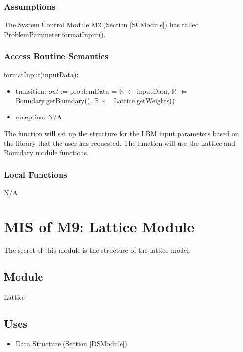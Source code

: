 \documentclass[12pt, titlepage]{article}
\begin{document}
\subsubsection{Assumptions}

The System Control Module M2 (Section \ref{SCModule}) has called ProblemParameter.formatInput().

\subsubsection{Access Routine Semantics}

\noindent formatInput(inputData):
\begin{itemize}
	\item transition: $out$ := problemData = $\mathbb{N}$ $\in$ inputData, $\mathbb{R}$ $\Leftarrow$ Boundary.getBoundary(), $\mathbb{R}$ $\Leftarrow$ Lattice.getWeights()
	\item exception: N/A
\end{itemize}

The function will set up the structure for the LBM input parameters based on the library that the user has requested. The function will use the Lattice and Boundary module functions.

\subsubsection{Local Functions}
N/A

\newpage

\section{MIS of M9: Lattice Module} \label{LAModule} 

The secret of this module is the structure of the lattice model.

\subsection{Module}

Lattice

\subsection{Uses}
\begin{itemize}
	\item Data Structure (Section \ref{DSModule})
\end{itemize}
\end{document}
